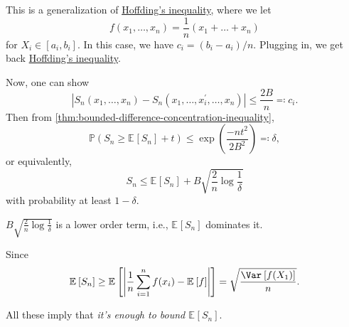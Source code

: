 \begin{remark}
	This is a generalization of \hyperref[thm:Hoeffding-inequality]{Hoffding's inequality}, where we let
	\[
		f(x_1, \dots , x_n) = \frac{1}{n}(x_1 + \dots + x_n)
	\]
	for \(X_i \in [a_i, b_i]\). In this case, we have \(c_i = (b_i - a_i) / n\). Plugging in, we get back \hyperref[thm:Hoeffding-inequality]{Hoffding's inequality}.
\end{remark}

Now, one can show
\[
	\left\vert S_n(x_1, \dots , x_n) - S_n(x_1, \dots , x_i^{\prime} , \dots , x_n) \right\vert \leq \frac{2B}{n} \eqqcolon c_i.
\]
Then from \autoref{thm:bounded-difference-concentration-inequality},
\[
	\mathbb{P} (S_n \geq \mathbb{E}_{}\left[S_n \right] + t) \leq \exp \left( \frac{-nt^2}{2B^2} \right) \eqqcolon \delta ,
\]
or equivalently,
\[
	S_n \leq \mathbb{E}_{}\left[S_n \right] + B \sqrt{\frac{2}{n}\log \frac{1}{\delta }}
\]
with probability at least \(1 - \delta \).

\begin{note}
	\(B \sqrt{\frac{2}{n} \log \frac{1}{\delta }} \) is a lower order term, i.e., \(\mathbb{E}_{}\left[S_n \right] \) dominates it.
\end{note}
\begin{explanation}
	Since
	\[
		\mathbb{E}_{}\left[S_n \right] \geq \mathbb{E}_{}\left[\left\vert \frac{1}{n} \sum_{i=1}^{n} f(x_i) - \mathbb{E}_{}\left[f \right] \right\vert \right] = \sqrt{\frac{\Var_{}\left[f(X_1) \right] }{n}} .
	\]
\end{explanation}

All these imply that \emph{it's enough to bound \(\mathbb{E}_{}\left[S_n \right] \)}.